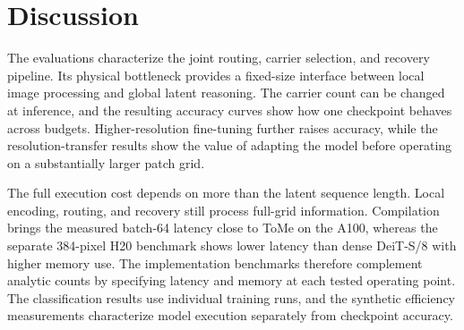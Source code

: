 \section{Discussion}

The evaluations characterize the joint routing, carrier selection, and
recovery pipeline. Its physical bottleneck provides a fixed-size interface
between local image processing and global latent reasoning. The carrier count can be
changed at inference, and the resulting accuracy curves show how one
checkpoint behaves across budgets. Higher-resolution fine-tuning further
raises accuracy, while the resolution-transfer results show the value of
adapting the model before operating on a substantially larger patch grid.

The full execution cost depends on more than the latent sequence length.
Local encoding, routing, and recovery still process full-grid information.
Compilation brings the measured batch-64 \mn{} latency close to ToMe on
the A100, whereas the separate 384-pixel H20 benchmark shows lower latency
than dense DeiT-S/8 with higher memory use. The implementation benchmarks therefore complement analytic counts by
specifying latency and memory at each tested operating point. The classification results use
individual training runs, and the synthetic efficiency
measurements characterize model execution separately from checkpoint accuracy.
